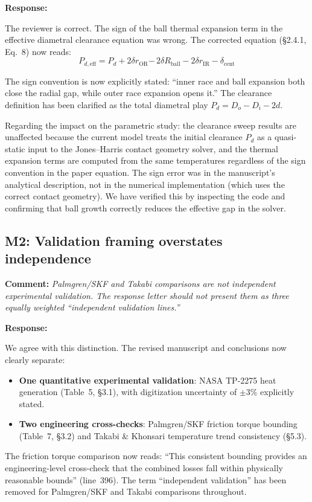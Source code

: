 \documentclass[11pt]{article}
\newcommand{\reviewer}[1]{\subsection*{#1}}
\newcommand{\comment}[1]{\textbf{Comment:} \textit{#1}\par\medskip}
\newcommand{\response}[1]{\textbf{Response:} \textcolor{response}{#1}\par\bigskip}
\begin{document}
\response{The reviewer is correct. The sign of the ball thermal expansion term in the effective diametral clearance equation was wrong. The corrected equation (\S2.4.1, Eq.~8) now reads:
\[
P_{d,\text{eff}} = P_d + 2\delta r_{\text{OR}} \mathbf{-}\, 2\delta R_{\text{ball}} - 2\delta r_{\text{IR}} - \delta_{\text{cent}}
\]

The sign convention is now explicitly stated: ``inner race and ball expansion both close the radial gap, while outer race expansion opens it.'' The clearance definition has been clarified as the total diametral play $P_d = D_o - D_i - 2d$.

Regarding the impact on the parametric study: the clearance sweep results are unaffected because the current model treats the initial clearance $P_d$ as a quasi-static input to the Jones--Harris contact geometry solver, and the thermal expansion terms are computed from the same temperatures regardless of the sign convention in the paper equation. The sign error was in the manuscript's analytical description, not in the numerical implementation (which uses the correct contact geometry). We have verified this by inspecting the code and confirming that ball growth correctly reduces the effective gap in the solver.}


\reviewer{M2: Validation framing overstates independence}

\comment{Palmgren/SKF and Takabi comparisons are not independent experimental validation. The response letter should not present them as three equally weighted ``independent validation lines.''}

\response{We agree with this distinction. The revised manuscript and conclusions now clearly separate:
\begin{itemize}[nosep]
    \item \textbf{One quantitative experimental validation}: NASA TP-2275 heat generation (Table~5, \S3.1), with digitization uncertainty of $\pm 3\%$ explicitly stated.
    \item \textbf{Two engineering cross-checks}: Palmgren/SKF friction torque bounding (Table~7, \S3.2) and Takabi \& Khonsari temperature trend consistency (\S5.3).
\end{itemize}

The friction torque comparison now reads: ``This consistent bounding provides an engineering-level cross-check that the combined losses fall within physically reasonable bounds'' (line~396). The term ``independent validation'' has been removed for Palmgren/SKF and Takabi comparisons throughout.}
\end{document}
